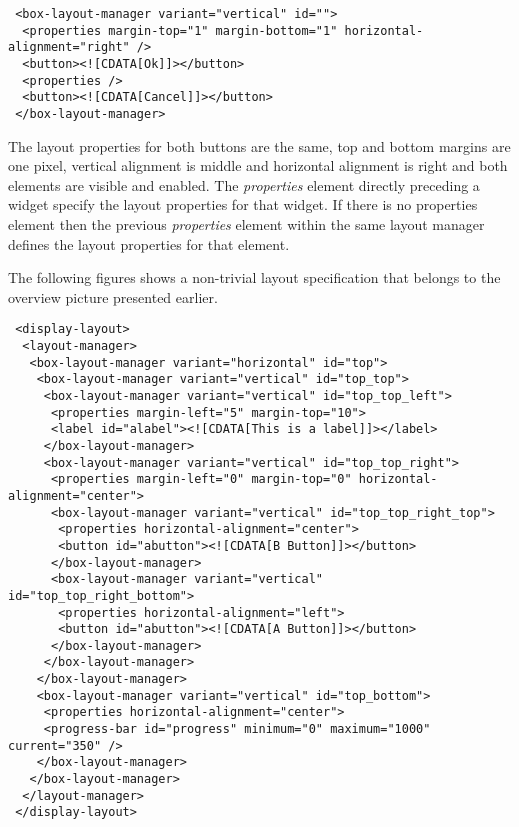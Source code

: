 \documentclass{article}
\begin{document}
   \enlargethispage{-\baselineskip}

   \small \begin{verbatim}
 <box-layout-manager variant="vertical" id="">
  <properties margin-top="1" margin-bottom="1" horizontal-alignment="right" />
  <button><![CDATA[Ok]]></button>
  <properties />
  <button><![CDATA[Cancel]]></button>
 </box-layout-manager>\end{verbatim}
 \normalsize

   \noindent The layout properties for both buttons are the same, top and bottom margins
   are one pixel, vertical alignment is middle and horizontal alignment is right
   and both elements are visible and enabled. The \textit{properties} element
   directly preceding a widget specify the layout properties for that widget. If
   there is no properties element then the previous \textit{properties} element
   within the same layout manager defines the layout properties for that
   element.

   The following figures shows a non-trivial layout specification that belongs
   to the overview picture presented earlier.

   \small \begin{verbatim}
 <display-layout>
  <layout-manager>
   <box-layout-manager variant="horizontal" id="top">
    <box-layout-manager variant="vertical" id="top_top">
     <box-layout-manager variant="vertical" id="top_top_left">
      <properties margin-left="5" margin-top="10">
      <label id="alabel"><![CDATA[This is a label]]></label>
     </box-layout-manager>
     <box-layout-manager variant="vertical" id="top_top_right">
      <properties margin-left="0" margin-top="0" horizontal-alignment="center">
      <box-layout-manager variant="vertical" id="top_top_right_top">
       <properties horizontal-alignment="center">
       <button id="abutton"><![CDATA[B Button]]></button>
      </box-layout-manager>
      <box-layout-manager variant="vertical" id="top_top_right_bottom">
       <properties horizontal-alignment="left">
       <button id="abutton"><![CDATA[A Button]]></button>
      </box-layout-manager>
     </box-layout-manager>
    </box-layout-manager>
    <box-layout-manager variant="vertical" id="top_bottom">
     <properties horizontal-alignment="center">
     <progress-bar id="progress" minimum="0" maximum="1000" current="350" />
    </box-layout-manager>
   </box-layout-manager>
  </layout-manager>
 </display-layout>\end{verbatim}
  \normalsize
\end{document}
